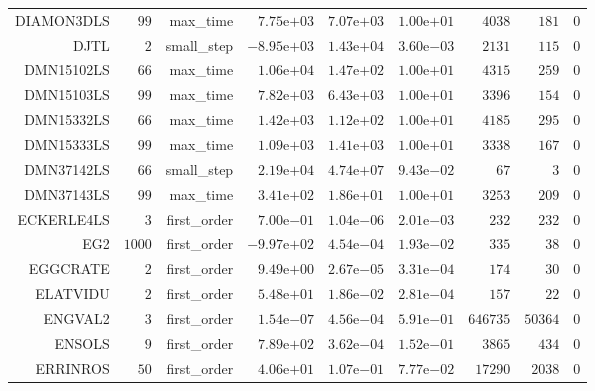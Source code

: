 \begin{longtable}{rrrrrrrrr}
DIAMON3DLS & \(    99\) & max\_time & \( 7.75\)e\(+03\) & \( 7.07\)e\(+03\) & \( 1.00\)e\(+01\) & \(  4038\) & \(   181\) & \(     0\) \\
DJTL & \(     2\) & small\_step & \(-8.95\)e\(+03\) & \( 1.43\)e\(+04\) & \( 3.60\)e\(-03\) & \(  2131\) & \(   115\) & \(     0\) \\
DMN15102LS & \(    66\) & max\_time & \( 1.06\)e\(+04\) & \( 1.47\)e\(+02\) & \( 1.00\)e\(+01\) & \(  4315\) & \(   259\) & \(     0\) \\
DMN15103LS & \(    99\) & max\_time & \( 7.82\)e\(+03\) & \( 6.43\)e\(+03\) & \( 1.00\)e\(+01\) & \(  3396\) & \(   154\) & \(     0\) \\
DMN15332LS & \(    66\) & max\_time & \( 1.42\)e\(+03\) & \( 1.12\)e\(+02\) & \( 1.00\)e\(+01\) & \(  4185\) & \(   295\) & \(     0\) \\
DMN15333LS & \(    99\) & max\_time & \( 1.09\)e\(+03\) & \( 1.41\)e\(+03\) & \( 1.00\)e\(+01\) & \(  3338\) & \(   167\) & \(     0\) \\
DMN37142LS & \(    66\) & small\_step & \( 2.19\)e\(+04\) & \( 4.74\)e\(+07\) & \( 9.43\)e\(-02\) & \(    67\) & \(     3\) & \(     0\) \\
DMN37143LS & \(    99\) & max\_time & \( 3.41\)e\(+02\) & \( 1.86\)e\(+01\) & \( 1.00\)e\(+01\) & \(  3253\) & \(   209\) & \(     0\) \\
ECKERLE4LS & \(     3\) & first\_order & \( 7.00\)e\(-01\) & \( 1.04\)e\(-06\) & \( 2.01\)e\(-03\) & \(   232\) & \(   232\) & \(     0\) \\
EG2 & \(  1000\) & first\_order & \(-9.97\)e\(+02\) & \( 4.54\)e\(-04\) & \( 1.93\)e\(-02\) & \(   335\) & \(    38\) & \(     0\) \\
EGGCRATE & \(     2\) & first\_order & \( 9.49\)e\(+00\) & \( 2.67\)e\(-05\) & \( 3.31\)e\(-04\) & \(   174\) & \(    30\) & \(     0\) \\
ELATVIDU & \(     2\) & first\_order & \( 5.48\)e\(+01\) & \( 1.86\)e\(-02\) & \( 2.81\)e\(-04\) & \(   157\) & \(    22\) & \(     0\) \\
ENGVAL2 & \(     3\) & first\_order & \( 1.54\)e\(-07\) & \( 4.56\)e\(-04\) & \( 5.91\)e\(-01\) & \(646735\) & \( 50364\) & \(     0\) \\
ENSOLS & \(     9\) & first\_order & \( 7.89\)e\(+02\) & \( 3.62\)e\(-04\) & \( 1.52\)e\(-01\) & \(  3865\) & \(   434\) & \(     0\) \\
ERRINROS & \(    50\) & first\_order & \( 4.06\)e\(+01\) & \( 1.07\)e\(-01\) & \( 7.77\)e\(-02\) & \( 17290\) & \(  2038\) & \(     0\) \\

\end{longtable}
